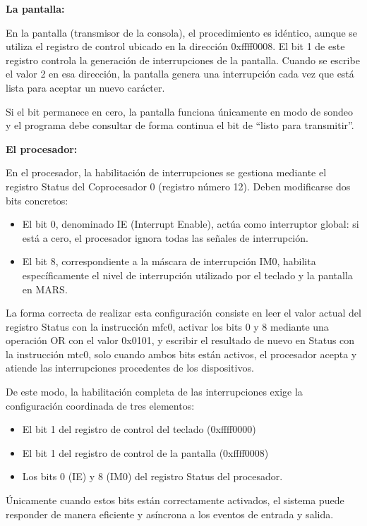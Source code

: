\documentclass[12pt, letterpaper]{article}
\begin{document}
\textbf{La pantalla:}

En la pantalla (transmisor de la consola), el procedimiento es idéntico, aunque se utiliza el registro de control ubicado en la dirección 0xffff0008. El bit 1 de este registro controla la generación de interrupciones de la pantalla. Cuando se escribe el valor 2 en esa dirección, la pantalla genera una interrupción cada vez que está lista para aceptar un nuevo carácter. 

Si el bit permanece en cero, la pantalla funciona únicamente en modo de sondeo y el programa debe consultar de forma continua el bit de “listo para transmitir”.

\textbf{El procesador:}

En el procesador, la habilitación de interrupciones se gestiona mediante el registro Status del Coprocesador 0 (registro número 12). Deben modificarse dos bits concretos:

\begin{itemize}
    \item El bit 0, denominado IE (Interrupt Enable), actúa como interruptor global: si está a cero, el procesador ignora todas las señales de interrupción.
    \item El bit 8, correspondiente a la máscara de interrupción IM0, habilita específicamente el nivel de interrupción utilizado por el teclado y la pantalla en MARS.
\end{itemize}

La forma correcta de realizar esta configuración consiste en leer el valor actual del registro Status con la instrucción mfc0, activar los bits 0 y 8 mediante una operación OR con el valor 0x0101, y escribir el resultado de nuevo en Status con la instrucción mtc0, solo cuando ambos bits están activos, el procesador acepta y atiende las interrupciones procedentes de los dispositivos.

De este modo, la habilitación completa de las interrupciones exige la configuración coordinada de tres elementos:

\begin{itemize}
    \item El bit 1 del registro de control del teclado (0xffff0000)
    \item El bit 1 del registro de control de la pantalla (0xffff0008)
    \item Los bits 0 (IE) y 8 (IM0) del registro Status del procesador.
\end{itemize}

Únicamente cuando estos bits están correctamente activados, el sistema puede responder de manera eficiente y asíncrona a los eventos de entrada y salida.
\end{document}
